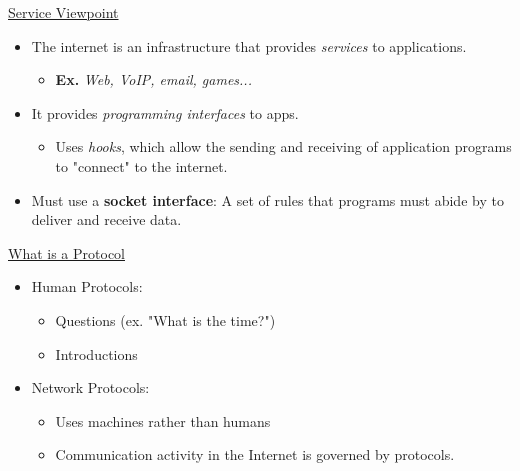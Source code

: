 \documentclass[12pt]{article}
\begin{document}
\underline{Service Viewpoint}

\begin{itemize}
\item The internet is an infrastructure that provides {\it services} to applications.
\begin{itemize}
\item {\bf Ex.} {\it Web, VoIP, email, games...}
\end{itemize}

\newpage

\item It provides {\it programming interfaces} to apps.
\begin{itemize}
\item Uses {\it hooks}, which allow the sending and receiving of application programs to "connect" to the internet.
\end{itemize}
\item Must use a {\bf socket interface}: A set of rules that programs must abide by to deliver and receive data.
\end{itemize}

\underline{What is a Protocol}

\begin{itemize}
\item Human Protocols:
\begin{itemize}
\item Questions (ex. "What is the time?")
\item Introductions
\end{itemize}
\item Network Protocols:
\begin{itemize}
\item Uses machines rather than humans
\item Communication activity in the Internet is governed by protocols.
\end{itemize}
\end{itemize}
\end{document}

